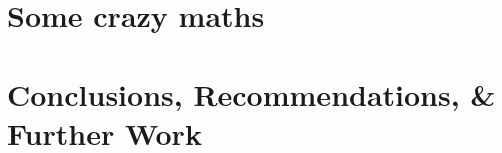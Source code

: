\documentclass[english,twoside,10pt]{extarticle}
\begin{document}
\section*{Some crazy maths}
\blindmathpaper

\section*{Conclusions, Recommendations, \& Further Work}
\begin{myquote}
\lipsum[66]
\end{myquote}

\begin{small}
	\nocite{*} %
	
\end{small}
\clearpage
\end{document}
